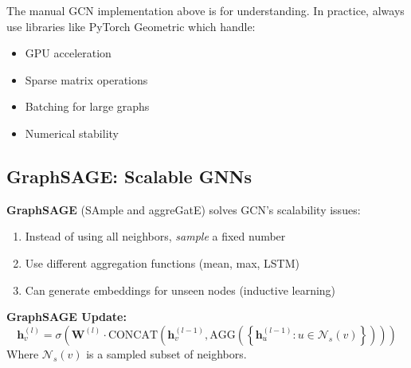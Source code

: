 \documentclass[12pt,a4paper]{article}
\begin{document}
\begin{warning}
The manual GCN implementation above is for understanding. In practice, always use libraries like PyTorch Geometric which handle:
\begin{itemize}
    \item GPU acceleration
    \item Sparse matrix operations
    \item Batching for large graphs
    \item Numerical stability
\end{itemize}
\end{warning}

\subsection{GraphSAGE: Scalable GNNs}

\begin{concept}
\textbf{GraphSAGE} (SAmple and aggreGatE) solves GCN's scalability issues:
\begin{enumerate}
    \item Instead of using all neighbors, \textit{sample} a fixed number
    \item Use different aggregation functions (mean, max, LSTM)
    \item Can generate embeddings for unseen nodes (inductive learning)
\end{enumerate}
\end{concept}

\begin{mathbox}
\textbf{GraphSAGE Update:}
\[
\mathbf{h}_v^{(l)} = \sigma\left(\mathbf{W}^{(l)} \cdot \text{CONCAT}\left(\mathbf{h}_v^{(l-1)}, \text{AGG}\left(\left\{\mathbf{h}_u^{(l-1)} : u \in \mathcal{N}_s(v)\right\}\right)\right)\right)
\]
Where $\mathcal{N}_s(v)$ is a sampled subset of neighbors.
\end{mathbox}
\end{document}
